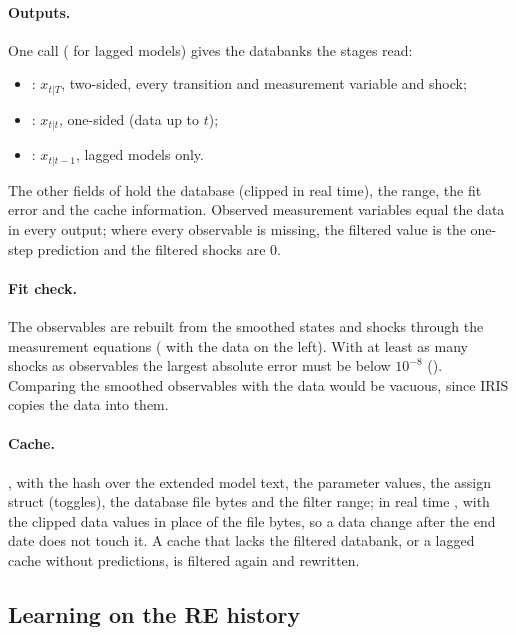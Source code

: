 \documentclass[11pt,a4paper]{article}
\begin{document}
\paragraph{Outputs.} One call  ( for lagged models) gives the databanks the stages read:
\begin{itemize}[nosep]
  \item {}: $x_{t|T}$, two-sided, every transition and measurement variable and shock;
  \item {}: $x_{t|t}$, one-sided (data up to $t$);
  \item {}: $x_{t|t-1}$, lagged models only.
\end{itemize}
The other fields of  hold the database (clipped in real time), the range, the fit error
and the cache information.
Observed measurement variables equal the data in every output; where every observable is missing,
the filtered value is the one-step prediction and the filtered shocks are 0.

\paragraph{Fit check.} The observables are rebuilt from the smoothed states and shocks through the
measurement equations ( with the data on the left). With at least as many shocks as
observables the largest absolute error must be below $10^{-8}$ ().
Comparing the smoothed observables with the data would be vacuous, since IRIS copies the data into
them.

\paragraph{Cache.} , with the hash over the extended model text,
the parameter values, the assign struct (toggles), the database file bytes and the filter range;
in real time , with the clipped data values in place of the file
bytes, so a data change after the end date does not touch it. A cache that lacks the filtered
databank, or a lagged cache without predictions, is filtered again and rewritten.

\subsection{Learning on the RE history}\label{sec:resmoother}
\end{document}

